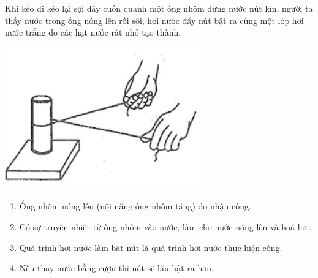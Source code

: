 \begin{ex}
	Khi kéo đi kéo lại sợi dây cuốn quanh một ống nhôm đựng nước nút kín, người ta thấy nước trong ống nóng lên rồi sôi, hơi nước đẩy nút bật ra cùng một lớp hơi nước trắng do các hạt nước rất nhỏ tạo thành.
	\begin{center}
		\includegraphics[width=0.3\linewidth]{figs/VN12-Y24-PH-SYL-003P-4}
	\end{center}
	\begin{enumerate}[label=\alph*)]
		\item Ống nhôm nóng lên (nội năng ông nhôm tăng) do nhận công.
		\item Có sự truyền nhiệt từ ống nhôm vào nước, làm cho nước nóng lên và hoá hơi.
		\item Quá trình hơi nước làm bật nút là quá trình hơi nước thực hiện công.
		\item Nếu thay nước bằng rượu thì nút sẽ lâu bật ra hơn.
	\end{enumerate}
	\end{ex}

